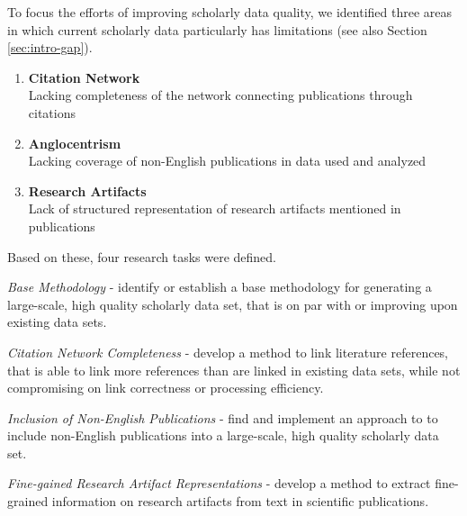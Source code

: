 To focus the efforts of improving scholarly data quality, we identified three areas in which current scholarly data particularly has limitations (see also Section \ref{sec:intro-gap}).

\begin{enumerate}
    \item \textbf{Citation Network}\\
          Lacking completeness of the network connecting publications through citations
    \item \textbf{Anglocentrism}\\
          Lacking coverage of non-English publications in data used and analyzed
    \item \textbf{Research Artifacts}\\
           Lack of structured representation of research artifacts mentioned in publications
\end{enumerate}

Based on these, four research tasks were defined.

\begin{rtlist}
    \item \textit{Base Methodology} - identify or establish a base methodology for generating a large-scale, high quality scholarly data set, that is on par with or improving upon existing data sets.
    \item \textit{Citation Network Completeness} - develop a method to link literature references, that is able to link more references than are linked in existing data sets, while not compromising on link correctness or processing efficiency.
    \item \textit{Inclusion of Non-English Publications} - find and implement an approach to to include non-English publications into a large-scale, high quality scholarly data set.
    \item \textit{Fine-gained Research Artifact Representations} - develop a method to extract fine-grained information on research artifacts from text in scientific publications.
\end{rtlist}

